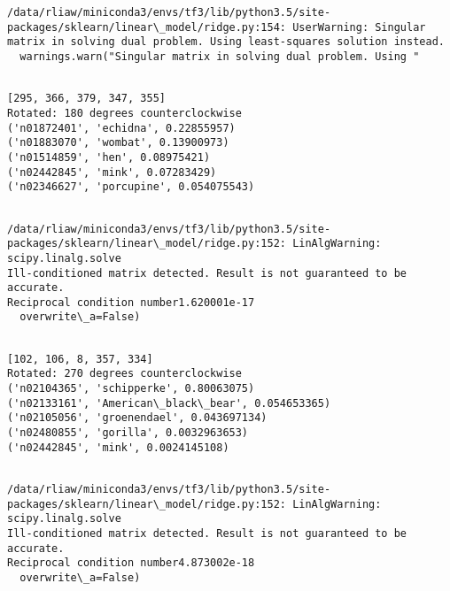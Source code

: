 \documentclass[11pt]{article}
\begin{document}
    \begin{Verbatim}[commandchars=\\\{\}]
/data/rliaw/miniconda3/envs/tf3/lib/python3.5/site-packages/sklearn/linear\_model/ridge.py:154: UserWarning: Singular matrix in solving dual problem. Using least-squares solution instead.
  warnings.warn("Singular matrix in solving dual problem. Using "

    \end{Verbatim}

    \begin{Verbatim}[commandchars=\\\{\}]

[295, 366, 379, 347, 355]
Rotated: 180 degrees counterclockwise
('n01872401', 'echidna', 0.22855957)
('n01883070', 'wombat', 0.13900973)
('n01514859', 'hen', 0.08975421)
('n02442845', 'mink', 0.07283429)
('n02346627', 'porcupine', 0.054075543)


    \end{Verbatim}

    \begin{Verbatim}[commandchars=\\\{\}]
/data/rliaw/miniconda3/envs/tf3/lib/python3.5/site-packages/sklearn/linear\_model/ridge.py:152: LinAlgWarning: scipy.linalg.solve
Ill-conditioned matrix detected. Result is not guaranteed to be accurate.
Reciprocal condition number1.620001e-17
  overwrite\_a=False)

    \end{Verbatim}

    \begin{Verbatim}[commandchars=\\\{\}]

[102, 106, 8, 357, 334]
Rotated: 270 degrees counterclockwise
('n02104365', 'schipperke', 0.80063075)
('n02133161', 'American\_black\_bear', 0.054653365)
('n02105056', 'groenendael', 0.043697134)
('n02480855', 'gorilla', 0.0032963653)
('n02442845', 'mink', 0.0024145108)


    \end{Verbatim}

    \begin{Verbatim}[commandchars=\\\{\}]
/data/rliaw/miniconda3/envs/tf3/lib/python3.5/site-packages/sklearn/linear\_model/ridge.py:152: LinAlgWarning: scipy.linalg.solve
Ill-conditioned matrix detected. Result is not guaranteed to be accurate.
Reciprocal condition number4.873002e-18
  overwrite\_a=False)

    \end{Verbatim}
\end{document}
